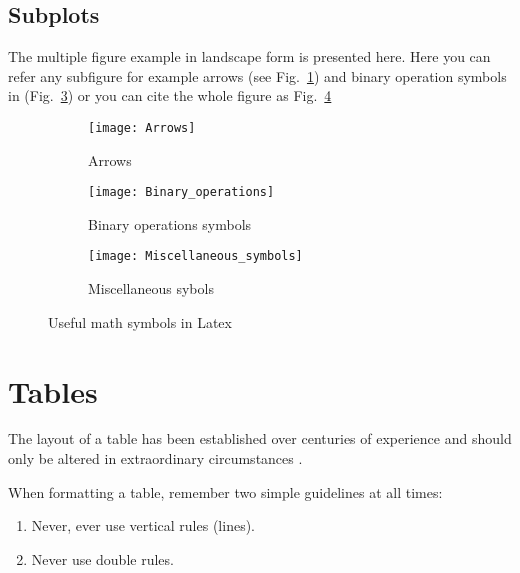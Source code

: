 \begin{landscape}

\section*{Subplots}
The multiple figure example in landscape form is presented here. Here you can refer any subfigure for example  arrows (see Fig.~\ref{fig:Arrows}) and binary operation symbols in (Fig.~\ref{fig:Miscsymb}) or you can cite the whole figure as Fig.~\ref{fig:Mathsymb}


\begin{figure}
  \centering
  \begin{subfigure}[b]{0.5\textwidth}
    \texttt{[image: Arrows]}
    \caption{Arrows}
    \label{fig:Arrows}   
  \end{subfigure}             
  \begin{subfigure}[b]{0.5\textwidth}
    \texttt{[image: Binary\_operations]}
    \caption{Binary operations symbols}
    \label{fig:Binarysymb}
  \end{subfigure}             
  \begin{subfigure}[b]{0.5\textwidth}
    \texttt{[image: Miscellaneous\_symbols]}
    \caption{Miscellaneous sybols}
    \label{fig:Miscsymb}
  \end{subfigure}
  \caption{Useful math symbols in Latex}
  \label{fig:Mathsymb}
\end{figure}

\end{landscape}

\section{Tables}

The layout of a table has been established over centuries of experience and 
should only be altered in extraordinary circumstances \cite{fear2005publication}. 

When formatting a table, remember two simple guidelines at all times:

\begin{enumerate}
	\item Never, ever use vertical rules (lines).
	\item Never use double rules.
\end{enumerate}

